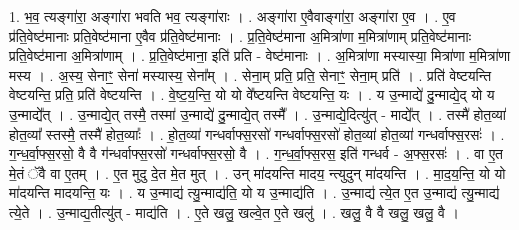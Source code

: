 \documentclass[17pt]{extarticle}
\begin{document}
1. भ॒व॒ त्यङ्गा॑रा॒ अङ्गा॑रा भवति भव॒ त्यङ्गा॑राः । . अङ्गा॑रा ए॒वैवाङ्गा॑रा॒ अङ्गा॑रा ए॒व । . ए॒व प्र॑ति॒वेष्ट॑मानाः प्रति॒वेष्ट॑माना ए॒वैव प्र॑ति॒वेष्ट॑मानाः । . प्र॒ति॒वेष्ट॑माना अ॒मित्रा॑णा म॒मित्रा॑णाम् प्रति॒वेष्ट॑मानाः प्रति॒वेष्ट॑माना अ॒मित्रा॑णाम् । . प्र॒ति॒वेष्ट॑माना॒ इति॑ प्रति - वेष्ट॑मानाः । . अ॒मित्रा॑णा मस्यास्या॒ मित्रा॑णा म॒मित्रा॑णा मस्य । . अ॒स्य॒ सेनाꣳ॒॒ सेना॑ मस्यास्य॒ सेना᳚म् । . सेना॒म् प्रति॒ प्रति॒ सेनाꣳ॒॒ सेना॒म् प्रति॑ । . प्रति॑ वेष्टयन्ति वेष्टयन्ति॒ प्रति॒ प्रति॑ वेष्टयन्ति । . वे॒ष्ट॒य॒न्ति॒ यो यो वे᳚ष्टयन्ति वेष्टयन्ति॒ यः । . य उ॒न्माद्ये॑ दु॒न्माद्ये॒द् यो य उ॒न्माद्ये᳚त् । . उ॒न्माद्ये॒त् तस्मै॒ तस्मा॑ उ॒न्माद्ये॑ दु॒न्माद्ये॒त् तस्मै᳚ । . उ॒न्माद्ये॒दित्यु॑त् - माद्ये᳚त् । . तस्मै॑ होत॒व्या॑ होत॒व्या᳚ स्तस्मै॒ तस्मै॑ होत॒व्याः᳚ । . हो॒त॒व्या॑ गन्धर्वाफ्स॒रसो॑ गन्धर्वाफ्स॒रसो॑ होत॒व्या॑ होत॒व्या॑ गन्धर्वाफ्स॒रसः॑ । . ग॒न्ध॒र्वा॒फ्स॒रसो॒ वै वै ग॑न्धर्वाफ्स॒रसो॑ गन्धर्वाफ्स॒रसो॒ वै । . ग॒न्ध॒र्वा॒फ्स॒रस॒ इति॑ गन्धर्व - अ॒फ्स॒रसः॑ । . वा ए॒त मे॒तं ॅवै वा ए॒तम् । . ए॒त मुदु दे॒त मे॒त मुत् । . उन् मा॑दयन्ति मादय॒ न्त्युदुन् मा॑दयन्ति । . मा॒द॒य॒न्ति॒ यो यो मा॑दयन्ति मादयन्ति॒ यः । . य उ॒न्माद्य॑ त्यु॒न्माद्य॑ति॒ यो य उ॒न्माद्य॑ति । . उ॒न्माद्य॑ त्ये॒त ए॒त उ॒न्माद्य॑ त्यु॒न्माद्य॑ त्ये॒ते । . उ॒न्माद्य॒तीत्यु॑त् - माद्य॑ति । . ए॒ते खलु॒ खल्वे॒त ए॒ते खलु॑ । . खलु॒ वै वै खलु॒ खलु॒ वै । \newline
\end{document}
